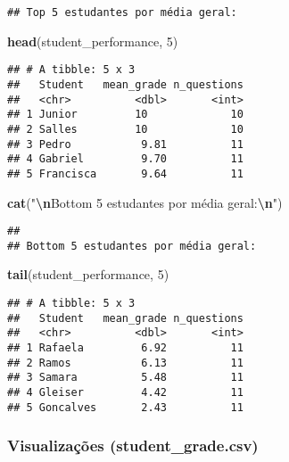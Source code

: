 \documentclass[
]{article}
\newenvironment{Shaded}{\begin{snugshade}}{\end{snugshade}}
\newcommand{\DecValTok}[1]{\textcolor[rgb]{0.00,0.00,0.81}{#1}}
\newcommand{\FunctionTok}[1]{\textcolor[rgb]{0.13,0.29,0.53}{\textbf{#1}}}
\newcommand{\NormalTok}[1]{#1}
\newcommand{\SpecialCharTok}[1]{\textcolor[rgb]{0.81,0.36,0.00}{\textbf{#1}}}
\newcommand{\StringTok}[1]{\textcolor[rgb]{0.31,0.60,0.02}{#1}}
\begin{document}
\begin{verbatim}
## Top 5 estudantes por média geral:
\end{verbatim}

\begin{Shaded}
\begin{Highlighting}[]
\FunctionTok{head}\NormalTok{(student\_performance, }\DecValTok{5}\NormalTok{)}
\end{Highlighting}
\end{Shaded}

\begin{verbatim}
## # A tibble: 5 x 3
##   Student   mean_grade n_questions
##   <chr>          <dbl>       <int>
## 1 Junior         10             10
## 2 Salles         10             10
## 3 Pedro           9.81          11
## 4 Gabriel         9.70          11
## 5 Francisca       9.64          11
\end{verbatim}

\begin{Shaded}
\begin{Highlighting}[]
\FunctionTok{cat}\NormalTok{(}\StringTok{"}\SpecialCharTok{\textbackslash{}n}\StringTok{Bottom 5 estudantes por média geral:}\SpecialCharTok{\textbackslash{}n}\StringTok{"}\NormalTok{)}
\end{Highlighting}
\end{Shaded}

\begin{verbatim}
## 
## Bottom 5 estudantes por média geral:
\end{verbatim}

\begin{Shaded}
\begin{Highlighting}[]
\FunctionTok{tail}\NormalTok{(student\_performance, }\DecValTok{5}\NormalTok{)}
\end{Highlighting}
\end{Shaded}

\begin{verbatim}
## # A tibble: 5 x 3
##   Student   mean_grade n_questions
##   <chr>          <dbl>       <int>
## 1 Rafaela         6.92          11
## 2 Ramos           6.13          11
## 3 Samara          5.48          11
## 4 Gleiser         4.42          11
## 5 Goncalves       2.43          11
\end{verbatim}

\subsubsection{Visualizações
(student\_grade.csv)}\label{visualizauxe7uxf5es-student_grade.csv}
\end{document}
